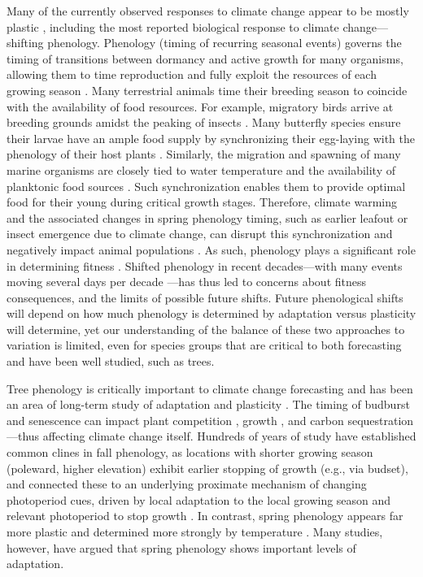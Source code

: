 \documentclass{article}
\begin{document}
Many of the currently observed responses to climate change appear to be mostly plastic \citep{burton22,zettle21,bonamour19, king17}, including the most reported biological response to climate change---shifting phenology. Phenology (timing of recurring seasonal events) governs the timing of transitions between dormancy and active growth for many organisms, allowing them to time reproduction and fully exploit the resources of each growing season \citep{chuine10,hanninen11}. Many terrestrial animals time their breeding season to coincide with the availability of food resources. For example, migratory birds arrive at breeding grounds amidst the peaking of insects \citep{hallfors20}. Many butterfly species ensure their larvae have an ample food supply by synchronizing their egg-laying with the phenology of their host plants \citep{rytteri21,posle18}. Similarly, the migration and spawning of many marine organisms are closely tied to water temperature and the availability of planktonic food sources \citep{genner10}. Such synchronization enables them to provide optimal food for their young during critical growth stages. Therefore, climate warming and the associated changes in spring phenology timing, such as earlier leafout or insect emergence due to climate change, can disrupt this synchronization and negatively impact animal populations \citep{wann19,renner18, chu17}. As such, phenology plays a significant role in determining fitness \citep{guo22, chuine01}. Shifted phenology in recent decades---with many events moving several days per decade \citep{vita21,khar18,Menzel06} ---has thus led to concerns about fitness consequences, and the limits of possible future shifts. Future phenological shifts will depend on how much phenology is determined by adaptation versus plasticity will determine, yet our understanding of the balance of these two approaches to variation is limited, even for species groups that are critical to both forecasting and have been well studied, such as trees. 

Tree phenology is critically important to climate change forecasting and has been an area of long-term study of adaptation and plasticity \citep{Cleland:2007or}. The timing of budburst and senescence can impact plant competition \citep{fridley12}, growth \citep{myneni97}, and carbon sequestration \citep{Barichivich12}---thus affecting climate change itself. Hundreds of years of study have established common clines in fall phenology, as locations with shorter growing season (poleward, higher elevation) exhibit earlier stopping of growth (e.g., via budset), and connected these to an underlying proximate mechanism of changing photoperiod cues, driven by local adaptation to the local growing season and relevant photoperiod to stop growth \citep{Alberto13,Savolainen07}. In contrast, spring phenology appears far more plastic \citep{AitkenBemmels16} and determined more strongly by temperature \citep{flynn18}. Many studies, however, have argued that spring phenology shows important levels of adaptation. 
\end{document}
